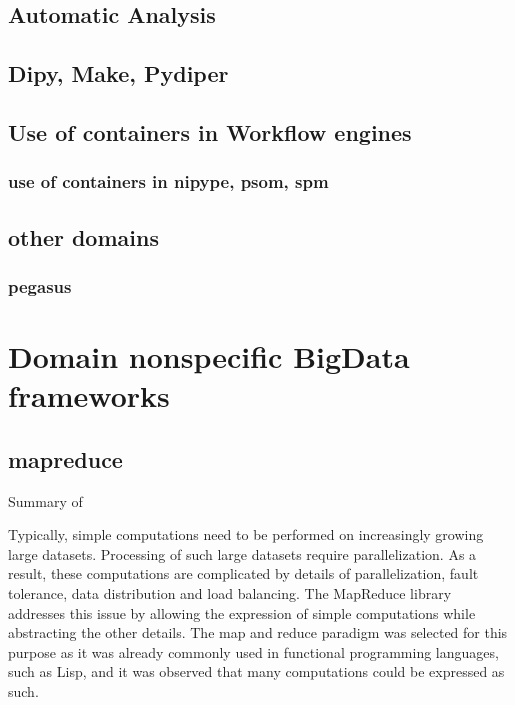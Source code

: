 \documentclass{report}
\begin{document}
    \section{Automatic Analysis}
    \section{Dipy, Make, Pydiper} 
    \section{Use of containers in Workflow engines} 
        \subsection{use of containers in nipype, psom, spm}
        
       \section{other domains}
       	\subsection{pegasus}
		
\chapter{Domain nonspecific BigData frameworks} 
    \section{mapreduce}
        Summary of ~\cite{mapred}

        Typically, simple computations need to be performed on 
        increasingly growing large datasets. Processing of such 
        large datasets require parallelization. As a result, 
        these computations are complicated by details of 
        parallelization, fault tolerance, data distribution and 
        load balancing. The MapReduce library addresses this issue 
        by allowing the expression of simple computations while 
        abstracting the other details. The map and reduce paradigm 
        was selected for this purpose as it was already commonly 
        used in functional programming languages, such as Lisp, and 
        it was observed that many computations could be expressed 
        as such.
\end{document}
